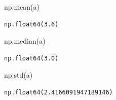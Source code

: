 \documentclass[
  letterpaper,
  DIV=11,
  numbers=noendperiod]{scrreprt}
\newenvironment{Shaded}{\begin{snugshade}}{\end{snugshade}}
\newcommand{\NormalTok}[1]{\textcolor[rgb]{0.00,0.23,0.31}{#1}}
\begin{document}
\begin{Shaded}
\begin{Highlighting}[]
\NormalTok{np.mean(a)}
\end{Highlighting}
\end{Shaded}

\begin{verbatim}
np.float64(3.6)
\end{verbatim}

\begin{Shaded}
\begin{Highlighting}[]
\NormalTok{np.median(a)}
\end{Highlighting}
\end{Shaded}

\begin{verbatim}
np.float64(3.0)
\end{verbatim}

\begin{Shaded}
\begin{Highlighting}[]
\NormalTok{np.std(a)}
\end{Highlighting}
\end{Shaded}

\begin{verbatim}
np.float64(2.4166091947189146)
\end{verbatim}
\end{document}
